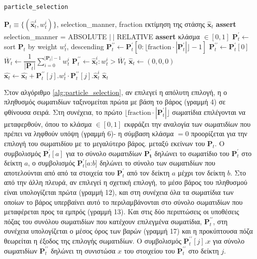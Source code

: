 \begin{algorithm}
  \caption{\texttt{particle\_selection}}
  \begin{spacing}{1.2}
  \begin{algorithmic}[1]
    \REQUIRE $\bm{P}_t \equiv \{(\hat{\bm{x}}_t^i, w_t^i)\}$, selection\_manner, fraction
    \ENSURE εκτίμηση της στάσης $\hat{\bm{x}}_t$
    \STATE \textbf{assert} selection\_manner = ABSOLUTE $|\ |$ RELATIVE
    \STATE \textbf{assert} κλάσμα $\in [0,1]$
      \STATE $\bm{P}_t^\prime \leftarrow $ sort $\bm{P}_t$ by weight $w_t^i$, descending
        \STATE $\bm{P}_t^{\prime\prime} \leftarrow \bm{P}_t^\prime[0: \lfloor\text{fraction}\cdot|\bm{P}_t^\prime| \rfloor - 1]$
      \ELSE
        \STATE $\bm{P}_t^{\prime\prime} \leftarrow \bm{P}_t^\prime[0]$
      \ENDIF
    \ENDIF
      \STATE $\overline{W}_t \leftarrow \dfrac{1}{|\bm{P}_t|}\sum\limits_{i=0}^{|\bm{P}_t|-1} w_t^i$
      \STATE $\bm{P}_t^{\prime\prime} \leftarrow \hat{\bm{x}}_t^i : w_t^i > \overline{W}_t$
    \ENDIF
    \STATE $\hat{\bm{x}}_t \leftarrow (0,0,0)$
      \STATE $\hat{\bm{x}_t} \leftarrow \hat{\bm{x}_t} + \bm{P}_t^{\prime\prime}[j].w_t^i \cdot \bm{P}_t^{\prime\prime}[j].\hat{\bm{x}}_t^i$
    \ENDFOR
    \RETURN $\hat{\bm{x}}_t$
  \end{algorithmic}
  \end{spacing}
  \label{alg:particle_selection}
\end{algorithm}

Στον αλγόριθμο \ref{alg:particle_selection}, αν επιλεγεί η απόλυτη επιλογή, η
ο πληθυσμός σωματιδίων ταξινομείται πρώτα με βάση το βάρος (γραμμή 4) σε φθίνουσα σειρά.
Στη συνέχεια, το πρώτο $\lfloor \text{fraction}\cdot|\bm{P}_t^\prime| \rfloor$
σωματίδια επιλέγονται να μεταφερθούν, όπου το κλάσμα $\in [0,1]$
εκφράζει την αναλογία των σωματιδίων που πρέπει να ληφθούν υπόψη (γραμμή 6)- η σύμβαση
κλάσμα $=0$ προορίζεται για την επιλογή του σωματιδίου με το μεγαλύτερο βάρος.
μεταξύ εκείνων του $\bm{P}_t$. Ο συμβολισμός $\bm{P}_t^\prime[a]$ για το σύνολο σωματιδίων
$\bm{\bm{P}_t^\prime}$ δηλώνει το σωματίδιο του $\bm{P}_t^\prime$ στο δείκτη $a$,
ο συμβολισμός $\bm{P}_t^\prime[a$:$b]$ δηλώνει το σύνολο των σωματιδίων που αποτελούνται από
από τα στοιχεία του $\bm{P}_t^\prime$ από τον δείκτη $a$ μέχρι τον δείκτη $b$. Στο
από την άλλη πλευρά, αν επιλεγεί η σχετική επιλογή, το μέσο βάρος του πληθυσμού είναι
υπολογίζεται πρώτα (γραμμή 12), και στη συνέχεια όλα τα σωματίδια των οποίων το βάρος υπερβαίνει αυτό το
περιλαμβάνονται στο σύνολο σωματιδίων που μεταφέρεται προς τα εμπρός (γραμμή 13). Και στις δύο
περιπτώσεις οι υποθέσεις πόζας του συνόλου σωματιδίων που κατέχουν επιλεγμένα σωματίδια,
$\bm{P}_t^{\prime\prime}$, στη συνέχεια υπολογίζεται ο μέσος όρος των βαρών (γραμμή 17) και η προκύπτουσα
πόζα θεωρείται η έξοδος της επιλογής σωματιδίων. Ο συμβολισμός
$\bm{P}_t^{\prime\prime}[j].x$ για σύνολο σωματιδίων $\bm{P}_t^{\prime\prime}$
δηλώνει τη συνιστώσα $x$ του στοιχείου του $\bm{P}_t^{\prime\prime}$ στο δείκτη
$j$.

